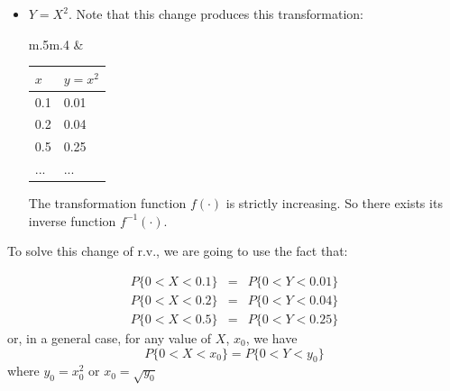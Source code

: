 \begin{itemize}
\item $Y = X^2$. Note that this change produces this transformation:
\begin{center}
\begin{tabular}{m{}m{}}
  &
 \begin{tabular}{l|l}
$x$ & $y = x^2$ \\ \hline
0.1 & 0.01\\
0.2 & 0.04\\
0.5 & 0.25\\
... & ...\\
\end{tabular} 
\end{tabular}
\end{center}

The transformation function $f(\cdot)$ is strictly increasing. So there exists its inverse function $f^{-1}(\cdot)$.

\end{itemize}
To solve this change of r.v., we are going to use the fact that:

\begin{eqnarray}
P\{0<X<0.1\} &  = & P\{0<Y<0.01\}  \nonumber\\
P\{0<X<0.2\} &  = & P\{0<Y<0.04\}  \nonumber\\
P\{0<X<0.5\} &  = & P\{0<Y<0.25\}  \nonumber
\end{eqnarray}
or, in a general case, for any value of $X$, $x_0$, we have
$$ P\{0<X<x_0\}  = P\{0<Y<y_0\}$$
where $y_0=x_0^2$ or $x_0= \sqrt{y_0}$ 


